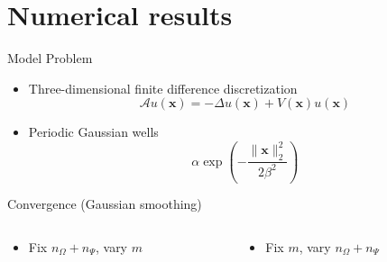 \documentclass[aspectratio=169, leqno, 12pt]{beamer}
\newcommand{\vct}[1]{\boldsymbol{#1}}
\begin{document}

\section{Numerical results}

\begin{frame}{Model Problem}
    \begin{itemize}
        \item Three-dimensional finite difference discretization \cite{lin2017randomized}
        \begin{equation}
            \mathcal{A} u(\vct{x}) = - \Delta u(\vct{x}) + V(\vct{x}) u(\vct{x})
        \end{equation}
        \item Periodic Gaussian wells
        \begin{equation}
            \alpha \exp(-\frac{\lVert \vct{x} \rVert _2^2}{ 2 \beta^2 })
        \end{equation}
    \end{itemize}
    \scalebox{0.85}{}
    \scalebox{0.85}{}
    \scalebox{0.85}{}
\end{frame}

\begin{frame}{Convergence (Gaussian smoothing)}
    \begin{columns}
        \begin{column}{0.5\textwidth}
            \begin{itemize}
                \item Fix $n_{\Omega} + n_{\Psi}$, vary $m$
            \end{itemize}
            \scalebox{1.0}{}
        \end{column}
        \begin{column}{0.5\textwidth}
            \begin{itemize}
                \item Fix $m$, vary $n_{\Omega} + n_{\Psi}$
            \end{itemize}
            \scalebox{1.0}{}
        \end{column}
    \end{columns}
\end{frame}
\end{document}
